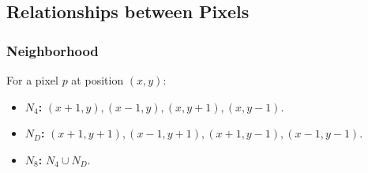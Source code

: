 \subsection*{Relationships between Pixels}

\subsubsection*{Neighborhood}

For a pixel $p$ at position $(x, y)$:

\begin{itemize}
  \item \textbf{$N_4$:} $(x + 1, y), (x - 1, y), (x, y + 1), (x, y - 1)$.
  \item \textbf{$N_D$:} $(x + 1, y + 1), (x - 1, y + 1), (x + 1, y -
    1), (x - 1, y - 1)$.
  \item \textbf{$N_8$:} $N_4 \cup N_D$.

\end{itemize}

